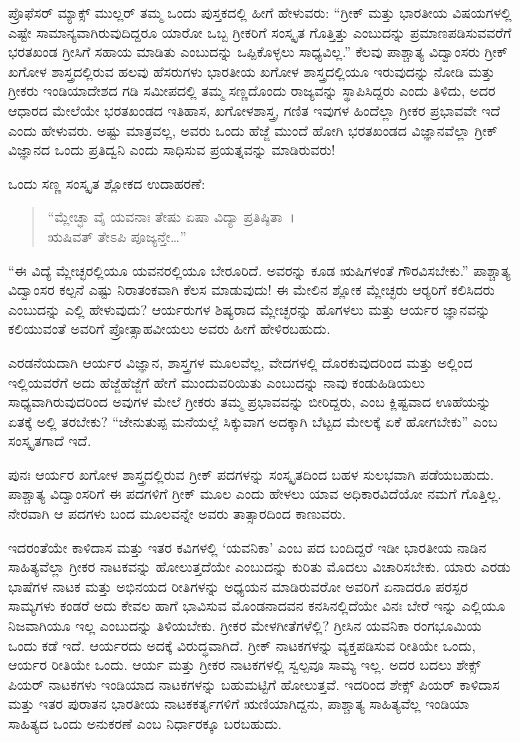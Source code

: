  ಪ್ರೊಫೆಸರ್ ಮ್ಯಾಕ್ಸ್ ಮುಲ್ಲರ್ ತಮ್ಮ ಒಂದು ಪುಸ್ತಕದಲ್ಲಿ ಹೀಗೆ ಹೇಳುವರು: “ಗ್ರೀಕ್ ಮತ್ತು ಭಾರತೀಯ ವಿಷಯಗಳಲ್ಲಿ ಎಷ್ಟೇ ಸಾಮಾನ್ಯವಾಗಿರುವುದಿದ್ದರೂ ಯಾರೋ ಒಬ್ಬ ಗ್ರೀಕರಿಗೆ ಸಂಸ್ಕೃತ ಗೊತ್ತಿತ್ತು ಎಂಬುದನ್ನು ಪ್ರಮಾಣಪಡಿಸುವವರೆಗೆ ಭರತಖಂಡ ಗ್ರೀಸಿಗೆ ಸಹಾಯ ಮಾಡಿತು ಎಂಬುದನ್ನು ಒಪ್ಪಿಕೊಳ್ಳಲು ಸಾಧ್ಯವಿಲ್ಲ.” ಕೆಲವು ಪಾಶ್ಚಾತ್ಯ ವಿದ್ವಾಂಸರು ಗ್ರೀಕ್ ಖಗೋಳ ಶಾಸ್ತ್ರದಲ್ಲಿರುವ ಹಲವು ಹೆಸರುಗಳು ಭಾರತೀಯ ಖಗೋಳ ಶಾಸ್ತ್ರದಲ್ಲಿಯೂ ಇರುವುದನ್ನು ನೋಡಿ ಮತ್ತು ಗ್ರೀಕರು ಇಂಡಿಯಾದೇಶದ ಗಡಿ ಸಮೀಪದಲ್ಲಿ ತಮ್ಮ ಸಣ್ಣದೊಂದು ರಾಜ್ಯವನ್ನು ಸ್ಥಾಪಿಸಿದ್ದರು ಎಂದು ತಿಳಿದು, ಅದರ ಆಧಾರದ ಮೇಲೆಯೇ ಭರತಖಂಡದ ಇತಿಹಾಸ, ಖಗೋಳಶಾಸ್ತ್ರ, ಗಣಿತ ಇವುಗಳ ಹಿಂದೆಲ್ಲಾ ಗ್ರೀಕರ ಪ್ರಭಾವವೇ ಇದೆ ಎಂದು ಹೇಳುವರು. ಅಷ್ಟು ಮಾತ್ರವಲ್ಲ, ಅವರು ಒಂದು ಹೆಜ್ಜೆ ಮುಂದೆ ಹೋಗಿ ಭರತಖಂಡದ ವಿಜ್ಞಾನವೆಲ್ಲಾ ಗ್ರೀಕ್ ವಿಜ್ಞಾನದ ಒಂದು ಪ್ರತಿದ್ವನಿ ಎಂದು ಸಾಧಿಸುವ ಪ್ರಯತ್ನವನ್ನು ಮಾಡಿರುವರು! 

 ಒಂದು ಸಣ್ಣ ಸಂಸ್ಕೃತ ಶ್ಲೋಕದ ಉದಾಹರಣೆ:

\begin{verse}
“ಮ್ಲೇಚ್ಛಾ ವೈ ಯವನಾಃ ತೇಷು ಏಷಾ ವಿದ್ಯಾ ಪ್ರತಿಷ್ಠಿತಾ~।\\ಋಷಿವತ್ ತೇಽಪಿ ಪೂಜ್ಯನ್ತೇ…” 
\end{verse}

 “ಈ ವಿದ್ಯೆ ಮ್ಲೇಚ್ಛರಲ್ಲಿಯೂ ಯವನರಲ್ಲಿಯೂ ಬೇರೂರಿದೆ. ಅವರನ್ನು ಕೂಡ ಋಷಿಗಳಂತೆ ಗೌರವಿಸಬೇಕು.” ಪಾಶ್ಚಾತ್ಯ ವಿದ್ವಾಂಸರ ಕಲ್ಪನೆ ಎಷ್ಟು ನಿರಾತಂಕವಾಗಿ ಕೆಲಸ ಮಾಡುವುದು! ಈ ಮೇಲಿನ ಶ್ಲೋಕ ಮ್ಲೇಚ್ಛರು ಆರ‍್ಯರಿಗೆ ಕಲಿಸಿದರು ಎಂಬುದನ್ನು ಎಲ್ಲಿ ಹೇಳುವುದು? ಆರ್ಯರುಗಳ ಶಿಷ್ಯರಾದ ಮ್ಲೇಚ್ಛರನ್ನು ಹೊಗಳಲು ಮತ್ತು ಆರ್ಯರ ಜ್ಞಾನವನ್ನು ಕಲಿಯುವಂತೆ ಅವರಿಗೆ ಪ್ರೋತ್ಸಾಹವೀಯಲು ಅವರು ಹೀಗೆ ಹೇಳಿರಬಹುದು. 

 ಎರಡನೆಯದಾಗಿ ಆರ್ಯರ ವಿಜ್ಞಾನ, ಶಾಸ್ತ್ರಗಳ ಮೂಲವೆಲ್ಲ, ವೇದಗಳಲ್ಲಿ ದೊರಕುವುದರಿಂದ ಮತ್ತು ಅಲ್ಲಿಂದ ಇಲ್ಲಿಯವರೆಗೆ ಅದು ಹೆಜ್ಜೆಹೆಜ್ಜೆಗೆ ಹೇಗೆ ಮುಂದುವರಿಯಿತು ಎಂಬುದನ್ನು ನಾವು ಕಂಡುಹಿಡಿಯಲು ಸಾಧ್ಯವಾಗಿರುವುದರಿಂದ ಅವುಗಳ ಮೇಲೆ ಗ್ರೀಕರು ತಮ್ಮ ಪ್ರಭಾವವನ್ನು ಬೀರಿದ್ದರು, ಎಂಬ ಕ್ಲಿಷ್ಟವಾದ ಊಹೆಯನ್ನು ಏತಕ್ಕೆ ಅಲ್ಲಿ ತರಬೇಕು? “ಜೇನುತುಪ್ಪ ಮನೆಯಲ್ಲೆ ಸಿಕ್ಕುವಾಗ ಅದಕ್ಕಾಗಿ ಬೆಟ್ಟದ ಮೇಲಕ್ಕೆ ಏಕೆ ಹೋಗಬೇಕು” ಎಂಬ ಸಂಸ್ಕೃತಗಾದೆ ಇದೆ. 

 ಪುನಃ ಆರ್ಯರ ಖಗೋಳ ಶಾಸ್ತ್ರದಲ್ಲಿರುವ ಗ್ರೀಕ್ ಪದಗಳನ್ನು ಸಂಸ್ಕೃತದಿಂದ ಬಹಳ ಸುಲಭವಾಗಿ ಪಡೆಯಬಹುದು. ಪಾಶ್ಚಾತ್ಯ ವಿದ್ವಾಂಸರಿಗೆ ಈ ಪದಗಳಿಗೆ ಗ್ರೀಕ್ ಮೂಲ ಎಂದು ಹೇಳಲು ಯಾವ ಅಧಿಕಾರವಿದೆಯೋ ನಮಗೆ ಗೊತ್ತಿಲ್ಲ. ನೇರವಾಗಿ ಆ ಪದಗಳು ಬಂದ ಮೂಲವನ್ನೇ ಅವರು ತಾತ್ಸಾರದಿಂದ ಕಾಣುವರು. 

 ಇದರಂತೆಯೇ ಕಾಳಿದಾಸ ಮತ್ತು ಇತರ ಕವಿಗಳಲ್ಲಿ ‘ಯವನಿಕಾ’ ಎಂಬ ಪದ ಬಂದಿದ್ದರೆ ಇಡೀ ಭಾರತೀಯ ನಾಡಿನ ಸಾಹಿತ್ಯವೆಲ್ಲಾ ಗ್ರೀಕರ ನಾಟಕವನ್ನು ಹೋಲುತ್ತದೆಯೇ ಎಂಬುದನ್ನು ಕುರಿತು ಮೊದಲು ವಿಚಾರಿಸಬೇಕು. ಯಾರು ಎರಡು ಭಾಷೆಗಳ ನಾಟಕ ಮತ್ತು ಅಭಿನಯದ ರೀತಿಗಳನ್ನು ಅಧ್ಯಯನ ಮಾಡಿರುವರೋ ಅವರಿಗೆ ಏನಾದರೂ ಪರಸ್ಪರ ಸಾಮ್ಯಗಳು ಕಂಡರೆ ಅದು ಕೇವಲ ಹಾಗೆ ಭಾವಿಸುವ ಮೊಂಡನಾದವನ ಕನಸಿನಲ್ಲಿದೆಯೇ ವಿನಃ ಬೇರೆ ಇನ್ನು ಎಲ್ಲಿಯೂ ನಿಜವಾಗಿಯೂ ಇಲ್ಲ ಎಂಬುದನ್ನು ತಿಳಿಯಬೇಕು. ಗ್ರೀಕರ ಮೇಳಗೀತೆಗಳೆಲ್ಲಿ? ಗ್ರೀಸಿನ ಯವನಿಕಾ ರಂಗಭೂಮಿಯ ಒಂದು ಕಡೆ ಇದೆ. ಆರ್ಯರದು ಅದಕ್ಕೆ ವಿರುದ್ಧವಾಗಿದೆ. ಗ್ರೀಕ್ ನಾಟಕಗಳನ್ನು ವ್ಯಕ್ತಪಡಿಸುವ ರೀತಿಯೇ ಒಂದು, ಆರ್ಯರ ರೀತಿಯೇ ಒಂದು. ಆರ್ಯ ಮತ್ತು ಗ್ರೀಕರ ನಾಟಕಗಳಲ್ಲಿ ಸ್ವಲ್ಪವೂ ಸಾಮ್ಯ ಇಲ್ಲ. ಅದರ ಬದಲು ಶೇಕ್ಸ್​ಪಿಯರ್ ನಾಟಕಗಳು ಇಂಡಿಯಾದ ನಾಟಕಗಳನ್ನು ಬಹುಮಟ್ಟಿಗೆ ಹೋಲುತ್ತವೆ. ಇದರಿಂದ ಶೇಕ್ಸ್ ಪಿಯರ್ ಕಾಳಿದಾಸ ಮತ್ತು ಇತರ ಪುರಾತನ ಭಾರತೀಯ ನಾಟಕಕರ್ತೃಗಳಿಗೆ ಋಣಿಯಾಗಿದ್ದನು, ಪಾಶ್ಚಾತ್ಯ ಸಾಹಿತ್ಯವೆಲ್ಲ ಇಂಡಿಯಾ ಸಾಹಿತ್ಯದ ಒಂದು ಅನುಕರಣೆ ಎಂಬ ನಿರ್ಧಾರಕ್ಕೂ ಬರಬಹುದು. 

